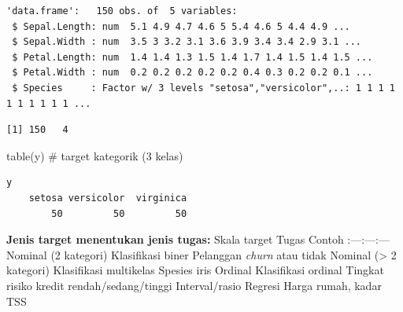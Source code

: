 \documentclass[
  indonesian,
  letterpaper,
]{book}
\newenvironment{Shaded}{\begin{snugshade}}{\end{snugshade}}
\newcommand{\CommentTok}[1]{\textcolor[rgb]{0.37,0.37,0.37}{#1}}
\newcommand{\FunctionTok}[1]{\textcolor[rgb]{0.28,0.35,0.67}{#1}}
\newcommand{\NormalTok}[1]{\textcolor[rgb]{0.00,0.23,0.31}{#1}}
\newcommand{\OtherTok}[1]{\textcolor[rgb]{0.00,0.23,0.31}{#1}}
\newcommand{\SpecialCharTok}[1]{\textcolor[rgb]{0.37,0.37,0.37}{#1}}
\newcommand{\StringTok}[1]{\textcolor[rgb]{0.13,0.47,0.30}{#1}}
\begin{document}
\begin{verbatim}
'data.frame':   150 obs. of  5 variables:
 $ Sepal.Length: num  5.1 4.9 4.7 4.6 5 5.4 4.6 5 4.4 4.9 ...
 $ Sepal.Width : num  3.5 3 3.2 3.1 3.6 3.9 3.4 3.4 2.9 3.1 ...
 $ Petal.Length: num  1.4 1.4 1.3 1.5 1.4 1.7 1.4 1.5 1.4 1.5 ...
 $ Petal.Width : num  0.2 0.2 0.2 0.2 0.2 0.4 0.3 0.2 0.2 0.1 ...
 $ Species     : Factor w/ 3 levels "setosa","versicolor",..: 1 1 1 1 1 1 1 1 1 1 ...
\end{verbatim}

\begin{Shaded}
\end{Shaded}

\begin{verbatim}
[1] 150   4
\end{verbatim}

\begin{Shaded}
\begin{Highlighting}[]
\FunctionTok{table}\NormalTok{(y) }\CommentTok{\# target kategorik (3 kelas)}
\end{Highlighting}
\end{Shaded}

\begin{verbatim}
y
    setosa versicolor  virginica 
        50         50         50 
\end{verbatim}

\textbf{Jenis target menentukan jenis tugas:} \textbar{} Skala target
\textbar{} Tugas \textbar{} Contoh \textbar{}
\textbar:---\textbar:---\textbar:---\textbar{} \textbar{} Nominal (2
kategori) \textbar{} Klasifikasi biner \textbar{} Pelanggan \emph{churn}
atau tidak \textbar{} \textbar{} Nominal (\textgreater{} 2 kategori)
\textbar{} Klasifikasi multikelas \textbar{} Spesies iris \textbar{}
\textbar{} Ordinal \textbar{} Klasifikasi ordinal \textbar{} Tingkat
risiko kredit rendah/sedang/tinggi \textbar{} \textbar{} Interval/rasio
\textbar{} Regresi \textbar{} Harga rumah, kadar TSS \textbar{}
\end{document}
